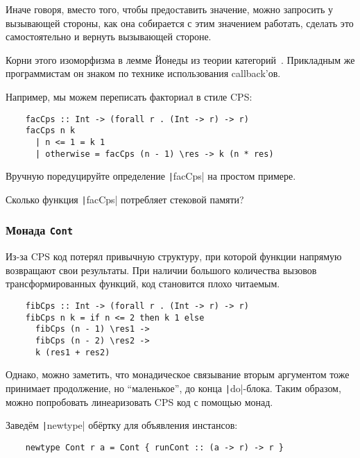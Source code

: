 Иначе говоря, вместо того, чтобы предоставить значение, можно запросить у вызывающей стороны, как она собирается с этим значением работать, сделать это самостоятельно и вернуть вызывающей стороне.

Корни этого изоморфизма в лемме Йонеды из теории категорий~\cite{hinze2010reason}.
Прикладным же программистам он знаком по технике использования callback'ов.

Например, мы можем переписать факториал в стиле CPS:
\begin{verbatim}
    facCps :: Int -> (forall r . (Int -> r) -> r)
    facCps n k
      | n <= 1 = k 1
      | otherwise = facCps (n - 1) \res -> k (n * res)
\end{verbatim}

\begin{task}
    Вручную поредуцируйте определение \texttt|facCps| на простом примере.
\end{task}

\begin{task}
    Сколько функция \texttt|facCps| потребляет стековой памяти?
\end{task}

\subsubsection{Монада \texttt{Cont}}

Из-за CPS код потерял привычную структуру, при которой функции напрямую возвращают свои результаты.
При наличии большого количества вызовов трансформированных функций, код становится плохо читаемым.

\begin{verbatim}
    fibCps :: Int -> (forall r . (Int -> r) -> r)
    fibCps n k = if n <= 2 then k 1 else
      fibCps (n - 1) \res1 ->
      fibCps (n - 2) \res2 ->
      k (res1 + res2)
\end{verbatim}

Однако, можно заметить, что монадическое связывание вторым аргументом тоже принимает продолжение, но ``маленькое'', до конца \texttt|do|-блока.
Таким образом, можно попробовать линеаризовать CPS код с помощью монад.

Заведём \texttt|newtype| обёртку для объявления инстансов:
\begin{verbatim}
    newtype Cont r a = Cont { runCont :: (a -> r) -> r }
\end{verbatim}

